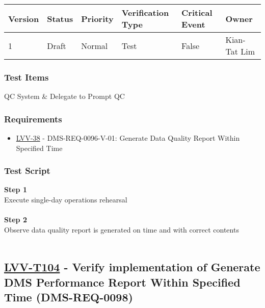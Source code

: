 \begin{longtable}[]{@{}llllll@{}}
\toprule
Version & Status & Priority & Verification Type & Critical Event &
Owner\tabularnewline
\midrule
\endhead
1 & Draft & Normal & Test & False & Kian-Tat Lim\tabularnewline
\bottomrule
\end{longtable}

\hypertarget{test-items-79}{%
\subsubsection{Test Items}\label{test-items-79}}

QC System \& Delegate to Prompt QC

\hypertarget{requirements-80}{%
\subsubsection{Requirements}\label{requirements-80}}

\begin{itemize}
\tightlist
\item
  \href{https://jira.lsstcorp.org/browse/LVV-38}{LVV-38} -
  DMS-REQ-0096-V-01: Generate Data Quality Report Within Specified Time
\end{itemize}

\hypertarget{test-script-80}{%
\subsubsection{Test Script}\label{test-script-80}}

\textbf{Step 1}\\
Execute single-day operations rehearsal\\
~\\
\textbf{Step 2}\\
Observe data quality report is generated on time and with correct
contents\\
~\\

\hypertarget{lvv-t104---verify-implementation-of-generate-dms-performance-report-within-specified-time-dms-req-0098}{%
\subsection{\texorpdfstring{\href{https://jira.lsstcorp.org/secure/Tests.jspa\#/testCase/LVV-T104}{LVV-T104}
- Verify implementation of Generate DMS Performance Report Within
Specified Time
(DMS-REQ-0098)}{LVV-T104 - Verify implementation of Generate DMS Performance Report Within Specified Time (DMS-REQ-0098)}}\label{lvv-t104---verify-implementation-of-generate-dms-performance-report-within-specified-time-dms-req-0098}}

